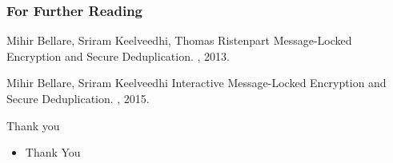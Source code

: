 \documentclass{beamer}
\begin{document}
\begin{frame}[allowframebreaks]
  \frametitle<presentation>{For Further Reading}
    
  \begin{thebibliography}{10}
    
%
% 
    
  \beamertemplatearticlebibitems

    Mihir Bellare, Sriram Keelveedhi, Thomas Ristenpart
    \newblock Message-Locked Encryption and Secure Deduplication.
    , 2013.
  
    Mihir Bellare, Sriram Keelveedhi
    \newblock Interactive Message-Locked Encryption and Secure Deduplication.
    , 2015.
  \end{thebibliography}
\end{frame}

\begin{frame}{Thank you}
	\begin{itemize}
		\setlength\itemsep{1em}
		\item Thank You
	\end{itemize}
\end{frame}
\end{document}
